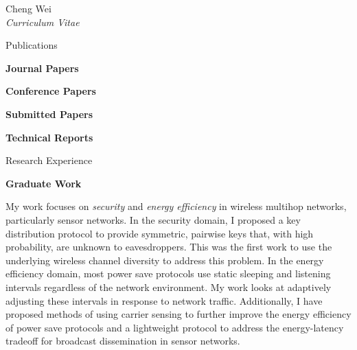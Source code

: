 \documentclass[10pt]{article}
\newenvironment{sublist}{%
	\begin{list}{}{%
		\setlength{\itemsep}{0em}\setlength{\parsep}{0em}%
		\setlength{\topsep}{0em}\setlength{\parskip}{0em}%
	}%
}%
{ \end{list} }
\begin{document}
\begin{cv}{Cheng Wei\\{\large \itshape Curriculum Vitae}}
\setlength{\oldcvlabelwidth}{\cvlabelwidth}
\setlength{\cvlabelwidth}{1em}
\renewcommand*{\bibindent}{1.5em}
\renewcommand*{\biblabelsep}{1.5em}

\begin{cvlist}{Publications}
	\item \textbf{Journal Papers}
	\item \textbf{Conference Papers} 
	\item \textbf{Submitted Papers} 
	\item \textbf{Technical Reports} 
\end{cvlist}
\setlength{\cvlabelwidth}{\oldcvlabelwidth}

\setlength{\oldcvlabelwidth}{\cvlabelwidth}
\setlength{\cvlabelwidth}{1em}
\begin{cvlist}{Research Experience}
	\item \textbf{Graduate Work}
	\begin{sublist}
		\item 
		My work focuses on \textit{security} and \textit{energy efficiency}
		in wireless
		multihop networks, particularly sensor networks.  In the
		security domain, I proposed a key distribution protocol to
		provide symmetric, pairwise keys that, with high
		probability, are unknown to eavesdroppers.  This was the first
		work to use the underlying wireless channel diversity
		to address this problem.  In the energy efficiency domain, most
		power save protocols use static sleeping and listening intervals
		regardless of the network environment.  My work looks at
		adaptively adjusting these intervals in response to
		network traffic.  Additionally, I have proposed methods of using
		carrier sensing to further improve the energy efficiency of
		power save protocols and a lightweight protocol to address the
		energy-latency tradeoff for broadcast dissemination in sensor
		networks.
	\end{sublist}


\end{cvlist}
\end{cv}
\end{document}
